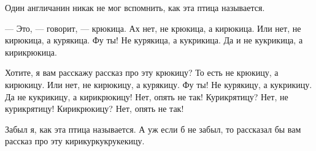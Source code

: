 Один англичанин никак не мог вспомнить, как эта птица называется.

--- Это, --- говорит, --- крюкица. Ах нет, не крюкица, а кирюкица. Или нет, не кирюкица, а курякица. Фу ты! Не курякица, а кукрикица. Да и не кукрикица, а кирикрюкица.

Хотите, я вам расскажу рассказ про эту крюкицу? То есть не крюкицу, а кирюкицу. Или нет, не кирюкицу, а курякицу. Фу ты! Не курякицу, а кукрикицу. Да не кукрикицу, а кирикрюкицу! Нет, опять не так! Курикрятицу? Нет, не курикрятицу! Кирикрюкицу? Нет, опять не так!

Забыл я, как эта птица называется. А уж если б не забыл, то рассказал бы вам рассказ про эту кирикуркукрукекицу.